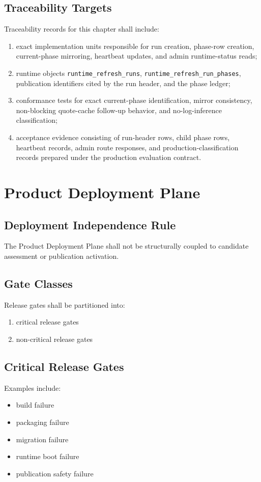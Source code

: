 \documentclass[11pt]{report}
\begin{document}
\section{Traceability Targets}
Traceability records for this chapter shall include:
\begin{enumerate}[leftmargin=1.2cm]
    \item exact implementation units responsible for run creation, phase-row creation, current-phase mirroring, heartbeat updates, and admin runtime-status reads;
    \item runtime objects \texttt{runtime\_refresh\_runs}, \texttt{runtime\_refresh\_run\_phases}, publication identifiers cited by the run header, and the phase ledger;
    \item conformance tests for exact current-phase identification, mirror consistency, non-blocking quote-cache follow-up behavior, and no-log-inference classification;
    \item acceptance evidence consisting of run-header rows, child phase rows, heartbeat records, admin route responses, and production-classification records prepared under the production evaluation contract.
\end{enumerate}
\chapter{Product Deployment Plane}
\section{Deployment Independence Rule}
The Product Deployment Plane shall not be structurally coupled to candidate assessment or publication activation.

\section{Gate Classes}
Release gates shall be partitioned into:
\begin{enumerate}[leftmargin=1.2cm]
    \item critical release gates
    \item non-critical release gates
\end{enumerate}

\section{Critical Release Gates}
Examples include:
\begin{itemize}
    \item build failure
    \item packaging failure
    \item migration failure
    \item runtime boot failure
    \item publication safety failure
\end{itemize}
\end{document}
